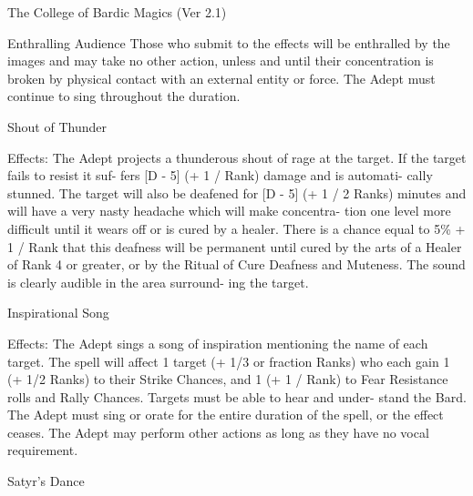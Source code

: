 \begin{Chapter}{The College of Bardic Magics (Ver 2.1)}
\begin{spell}[S-6]{Enthralling Audience }
Those  who submit to the effects will be enthralled 
by the images and may take no other action, unless 
and until their concentration is broken by physical 
contact with an external entity or force. The Adept 
must continue to sing throughout the duration. 
\end{spell}

\begin{spell}[S-7]{Shout of Thunder }

Effects:  The  Adept  projects  a  thunderous  shout  of 
rage at the target. If the target fails to resist it suf-
fers  [D  -  5]  (+  1 / Rank) damage  and  is automati-
cally stunned. The target will also be deafened for 
[D  -  5]  (+  1  /  2  Ranks)  minutes  and  will  have  a 
very  nasty  headache  which  will  make  concentra-
tion one level more difficult until it wears off or is 
cured by a healer. There is a chance equal to 5\% + 
1 / Rank that this deafness will be permanent until 
cured by the arts of a Healer of Rank 4 or greater, 
or  by  the  Ritual  of  Cure  Deafness  and  Muteness. 
The  sound  is  clearly  audible  in  the  area  surround-
ing the target. 
\end{spell}

\begin{spell}[S-8]{Inspirational Song }

Effects:  The  Adept  sings  a  song  of  inspiration 
mentioning the name of each target. The spell will 
affect  1  target  (+  1/3  or  fraction  Ranks)  who  each 
gain 1 (+ 1/2 Ranks) to their Strike Chances, and 1 
(+  1  /  Rank)  to  Fear  Resistance  rolls  and  Rally 
Chances.  Targets  must  be  able  to  hear  and  under-
stand  the  Bard.  The  Adept  must  sing  or  orate  for 
the entire duration of the spell, or the effect ceases. 
The  Adept  may  perform  other  actions  as  long  as 
they have no vocal requirement. 
\end{spell}

\begin{spell}[S-9]{Satyr’s Dance}


\end{spell}
\end{Chapter}
